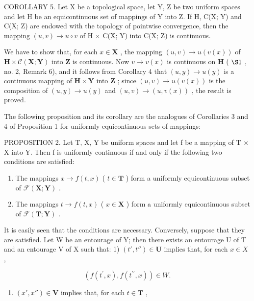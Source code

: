 COROLLARY 5. Let X be a topological space, let Y, Z be two uniform spaces and let H be an equicontinuous set of mappings of Y into Z. If H, C(X; Y) and C(X; Z) are endowed with the topology of pointwise convergence, then the mapping \((u, v) \to u \circ v\) of H × C(X; Y) into C(X; Z) is continuous.

We have to show that, for each \(x \in \mathbf{X}\) , the mapping \((u, v) \to u(v(x))\) of \(\mathbf{H} \times \mathcal{C}(\mathbf{X}; \mathbf{Y})\) into \(\mathbf{Z}\) is continuous. Now \(v \to v(x)\) is continuous on \(\mathbf{H}\) ( \(\S 1\) , no. 2, Remark 6), and it follows from Corollary 4 that \((u, y) \to u(y)\) is a continuous mapping of \(\mathbf{H} \times \mathbf{Y}\) into \(\mathbf{Z}\) ; since \((u, v) \to u(v(x))\) is the composition of \((u, y) \to u(y)\) and \((u, v) \to (u, v(x))\) , the result is proved.

The following proposition and its corollary are the analogues of Corollaries 3 and 4 of Proposition 1 for uniformly equicontinuous sets of mappings:

PROPOSITION 2. Let T, X, Y be uniform spaces and let f be a mapping of T × X into Y. Then f is uniformly continuous if and only if the following two conditions are satisfied:

\begin{enumerate}
\def\labelenumi{\arabic{enumi})}
\item
  The mappings \(x \to f(t, x)\) ( \(t \in \mathbf{T}\) ) form a uniformly equicontinuous subset of \(\mathcal{F}(\mathbf{X}; \mathbf{Y})\) .
\item
  The mappings \(t \to f(t, x)\) ( \(x \in \mathbf{X}\) ) form a uniformly equicontinuous subset of \(\mathcal{F}(\mathbf{T}; \mathbf{Y})\) .
\end{enumerate}

It is easily seen that the conditions are necessary. Conversely, suppose that they are satisfied. Let W be an entourage of Y; then there exists an entourage U of T and an entourage V of X such that: 1) \((t', t'') \in \mathbf{U}\) implies that, for each \(x \in X\) ,

\[
\left(f \left(t ^ {\prime}, x\right), f \left(t ^ {\prime \prime}, x\right)\right) \in W.
\]

\begin{enumerate}
\def\labelenumi{\arabic{enumi})}
\setcounter{enumi}{1}
\tightlist
\item
  \((x', x'') \in \mathbf{V}\) implies that, for each \(t \in \mathbf{T}\) ,
\end{enumerate}

